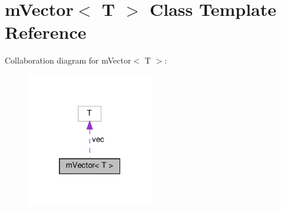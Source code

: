 \hypertarget{classmVector}{}\section{m\+Vector$<$ T $>$ Class Template Reference}
\label{classmVector}


Collaboration diagram for m\+Vector$<$ T $>$\+:
\nopagebreak
\begin{figure}[H]
\begin{center}
\leavevmode
\includegraphics[width=157pt]{classmVector__coll__graph}
\end{center}
\end{figure}
